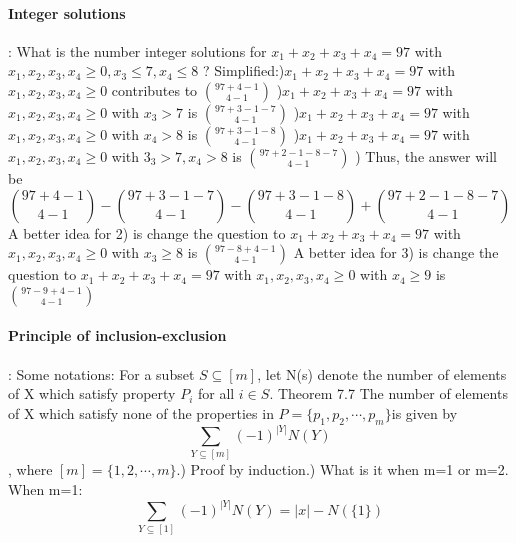 \documentclass{article}
\begin{document}
\paragraph{Integer solutions}:\newline
What is the number integer solutions for $x_1+x_2+x_3+x_4=97$ with $x_1,x_2,x_3,x_4 \ge 0, x_3 \leq 7, x_4 \leq 8$ ?\newline
Simplified:)$x_1+x_2+x_3+x_4=97$ with $x_1,x_2,x_3,x_4 \ge 0$ contributes to $\binom{97+4-1}{4-1}$ )$x_1+x_2+x_3+x_4=97$ with $x_1,x_2,x_3,x_4 \ge 0$ with $x_3>7$ is $\binom{97+3-1-7}{4-1}$ )$x_1+x_2+x_3+x_4=97$ with $x_1,x_2,x_3,x_4 \ge 0$ with $x_4>8$ is $\binom{97+3-1-8}{4-1}$ )$x_1+x_2+x_3+x_4=97$ with $x_1,x_2,x_3,x_4 \ge 0$ with $3_3>7,x_4>8$ is $\binom{97+2-1-8-7}{4-1}$ ) Thus, the answer will be $$\binom{97+4-1}{4-1}-\binom{97+3-1-7}{4-1}-\binom{97+3-1-8}{4-1}+\binom{97+2-1-8-7}{4-1}$$
A better idea for 2) is change the question to $x_1+x_2+x_3+x_4=97$ with $x_1,x_2,x_3,x_4 \ge 0$ with $x_3 \ge 8$ is $\binom{97-8+4-1}{4-1}$\newline
A better idea for 3) is change the question to $x_1+x_2+x_3+x_4=97$ with $x_1,x_2,x_3,x_4 \ge 0$ with $x_4 \ge 9$ is $\binom{97-9+4-1}{4-1}$\newline
\paragraph{Principle of inclusion-exclusion}:\newline
Some notations:\newline
For  a subset $S\subseteq [m]$, let N(s) denote the number of elements of X which satisfy property $P_i$ for all $i\in S$.
Theorem 7.7 \newline
The number of elements of X which satisfy none of the
properties in $P = \{p_1,p_2,\cdots,p_m\}$is given by $$\sum_{Y\subseteq [m]}(-1)^{|Y|}N(Y)$$,
where $[m]=\{1,2,\cdots ,m\}$.) Proof by induction.) What is it when m=1 or m=2.\newline
When m=1:\newline
$$\sum_{Y\subseteq [1]}(-1)^{|Y|}N(Y)=|x|-N(\{1\})$$
\end{document}
